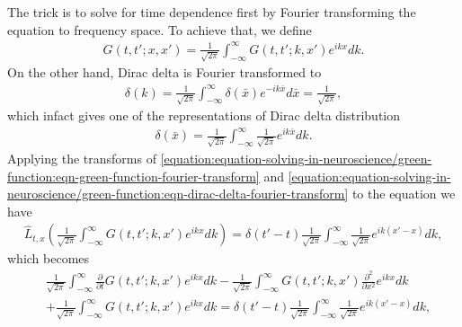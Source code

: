 \documentclass[letterpaper,10pt,english]{sphinxmanual}
\begin{document}
The trick is to solve for time dependence first by Fourier transforming the equation to frequency space. To achieve that, we define
\label{\detokenize{equation-solving-in-neuroscience/green-function:equation-eqn-green-function-fourier-transform}}\begin{equation}\label{equation:equation-solving-in-neuroscience/green-function:eqn-green-function-fourier-transform}
\begin{split}G(t,t';x,x') = \frac{1}{\sqrt{2\pi}}\int_{-\infty}^\infty G(t,t';k,x')e^{ikx}dk.\end{split}
\end{equation}
On the other hand, Dirac delta is Fourier transformed to
\label{\detokenize{equation-solving-in-neuroscience/green-function:equation-eqn-dirac-delta-fourier-transform}}\begin{equation}\label{equation:equation-solving-in-neuroscience/green-function:eqn-dirac-delta-fourier-transform}
\begin{split}\delta(k) = \frac{1}{\sqrt{2\pi}} \int_{-\infty}^\infty \delta(\bar x) e^{- ik \bar x} d\bar x = \frac{1}{\sqrt{2\pi}} ,\end{split}
\end{equation}
which infact gives one of the representations of Dirac delta distribution
\begin{equation*}
\begin{split}\delta(\bar x) = \frac{1}{\sqrt{2\pi}}\int_{-\infty}^\infty \frac{1}{\sqrt{2\pi}} e^{ik \bar x} dk .\end{split}
\end{equation*}
Applying the transforms of \eqref{equation:equation-solving-in-neuroscience/green-function:eqn-green-function-fourier-transform} and \eqref{equation:equation-solving-in-neuroscience/green-function:eqn-dirac-delta-fourier-transform} to the equation we have
\begin{equation*}
\begin{split}\hat L_{t,x}\left( \frac{1}{\sqrt{2\pi}}\int_{-\infty}^\infty G(t,t';k,x')  e^{i kx} dk \right) = \delta(t'-t) \frac{1}{\sqrt{2\pi}} \int_{-\infty}^\infty \frac{1}{\sqrt{2\pi}}  e^{i k(x'-x)} dk,\end{split}
\end{equation*}
which becomes
\begin{equation*}
\begin{split}&\frac{1}{\sqrt{2\pi}}\int_{-\infty}^\infty \frac{\partial}{\partial t}  G(t,t';k,x') e^{ikx}dk - \frac{1}{\sqrt{2\pi}}\int_{-\infty}^\infty  G(t,t';k,x') \frac{\partial^2}{\partial x^2} e^{ikx}dk  \\
&+  \frac{1}{\sqrt{2\pi}}\int_{-\infty}^\infty G(t,t';k,x')e^{ikx}dk = \delta(t'-t) \frac{1}{\sqrt{2\pi}} \int_{-\infty}^\infty \frac{1}{\sqrt{2\pi}} e^{ik(x'-x)} dk,\end{split}
\end{equation*}
\end{document}
